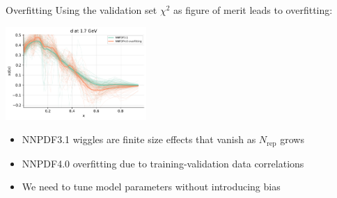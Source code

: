 \documentclass[aspectratio=169,10pt]{beamer}
\begin{document}
\begin{frame}{Overfitting}
Using the validation set $\chi^2$ as figure of merit leads to overfitting:
\begin{center}
\includegraphics[width=0.4\textwidth]{methodology/overfit_nnpdf31}
\end{center}
    \begin{itemize}
        \item NNPDF3.1 wiggles are finite size effects that vanish as $N_\mathrm{rep}$ grows
        \item NNPDF4.0 overfitting due to training-validation data correlations 
        \item We need to tune model parameters without introducing bias
    \end{itemize}
\end{frame}
\end{document}
